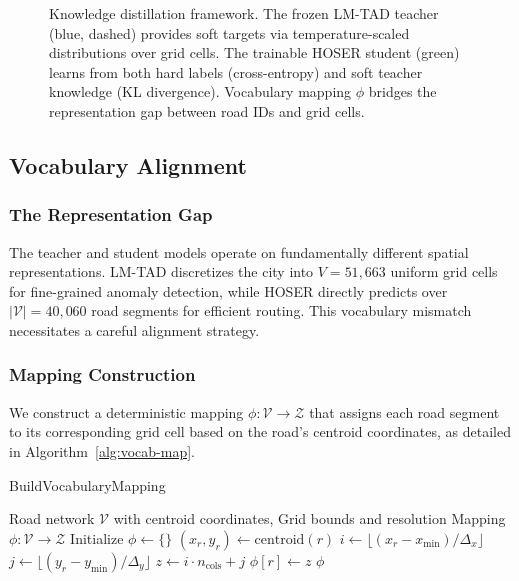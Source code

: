 \begin{figure}[t]
\caption{Knowledge distillation framework. The frozen LM-TAD teacher (blue, dashed) provides soft targets via temperature-scaled distributions over grid cells. The trainable HOSER student (green) learns from both hard labels (cross-entropy) and soft teacher knowledge (KL divergence). Vocabulary mapping $\phi$ bridges the representation gap between road IDs and grid cells.}
\label{fig:distillation-framework}
\end{figure}

\subsection{Vocabulary Alignment}
\label{sec:method-vocab}

\subsubsection{The Representation Gap}
The teacher and student models operate on fundamentally different spatial representations. LM-TAD discretizes the city into $V = 51{,}663$ uniform grid cells for fine-grained anomaly detection, while HOSER directly predicts over $|\mathcal{V}| = 40{,}060$ road segments for efficient routing. This vocabulary mismatch necessitates a careful alignment strategy.

\subsubsection{Mapping Construction}
We construct a deterministic mapping $\phi: \mathcal{V} \rightarrow \mathcal{Z}$ that assigns each road segment to its corresponding grid cell based on the road's centroid coordinates, as detailed in Algorithm~\ref{alg:vocab-map}.

\begin{algorithm}[t]
\caption{BuildVocabularyMapping}
\label{alg:vocab-map}
\begin{algorithmic}
\Require Road network $\mathcal{V}$ with centroid coordinates, Grid bounds and resolution
\Ensure Mapping $\phi: \mathcal{V} \rightarrow \mathcal{Z}$
\State Initialize $\phi \gets \{\}$
    \State $(x_r, y_r) \gets \text{centroid}(r)$
    \State $i \gets \lfloor (x_r - x_{\min}) / \Delta_x \rfloor$ 
    \State $j \gets \lfloor (y_r - y_{\min}) / \Delta_y \rfloor$ 
    \State $z \gets i \cdot n_{\text{cols}} + j$ 
    \State $\phi[r] \gets z$
\EndFor
\State \Return $\phi$
\end{algorithmic}
\end{algorithm}

